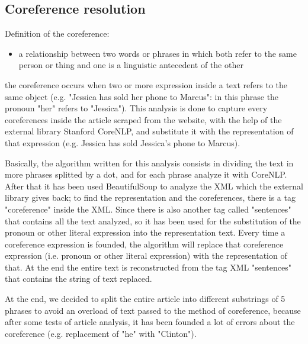 \subsection{Coreference resolution}
Definition of the coreference:
\begin{itemize}
	\item a relationship between two words or phrases in which both refer to the same person or thing and one is a linguistic antecedent of the other
\end{itemize}
the coreference occurs when two or more expression inside a text refers to the same object (e.g. "Jessica has sold her phone to Marcus": in this phrase the pronoun "her" refers to "Jessica"). 
This analysis is done to capture every coreferences inside the article scraped from the website, with the help of the external library Stanford CoreNLP, and substitute it with the representation of that expression (e.g. Jessica has sold Jessica's phone to Marcus).
\par 
Basically, the algorithm written for this analysis consists in dividing the text in more phrases splitted by a dot, and for each phrase analyze it with CoreNLP. 
After that it has been used BeautifulSoup to analyze the XML which the external library gives back; to find the representation and the coreferences, there is a tag "coreference" inside the XML. 
Since there is also another tag called "sentences" that contains all the text analyzed, so it has been used for the substitution of the pronoun or other literal expression into the representation text. 
Every time a coreference expression is founded, the algorithm will replace that coreference expression (i.e. pronoun or other literal expression) with the representation of that. 
At the end the entire text is reconstructed from the tag XML "sentences" that contains the string of text replaced.
\par
At the end, we decided to split the entire article into different substrings of 5 phrases to avoid an overload of text passed to the method of coreference, because after some tests of article analysis, it has been founded a lot of errors about the coreference (e.g. replacement of "he" with "Clinton"). 

